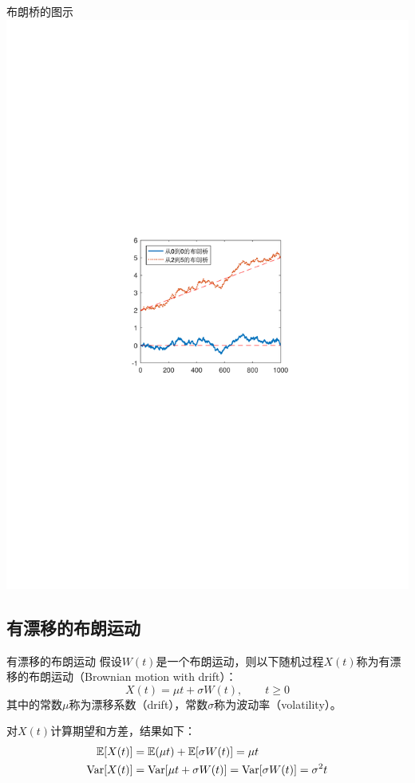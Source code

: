 \documentclass[t]{beamer}
\newcommand{\E}{\mathbb{E}}
\newcommand{\Var}{{\rm Var}}
\begin{document}
\begin{frame}{布朗桥的图示}
  \centering
	\includegraphics[scale=1]{fig/bb1.pdf}
\end{frame}

\subsection{有漂移的布朗运动}
\begin{frame}{有漂移的布朗运动}
  假设$W(t)$是一个布朗运动，则以下随机过程$X(t)$称为有漂移的布朗运动（Brownian motion with drift）：
  \begin{equation*}
  X(t)=\mu t+\sigma W(t), \qquad t\ge 0
  \end{equation*}
  其中的常数$\mu$称为漂移系数（drift），常数$\sigma$称为波动率（volatility）。

  对$X(t)$计算期望和方差，结果如下：
\begin{equation*}
\begin{split}
\E[X(t)]&=\E(\mu t)+\E[\sigma W(t)]=\mu t\\
\Var[X(t)]&=\Var[\mu t+\sigma W(t)]=\Var[\sigma W(t)]=\sigma^2 t
\end{split}
\end{equation*}
\end{frame}
\end{document}
